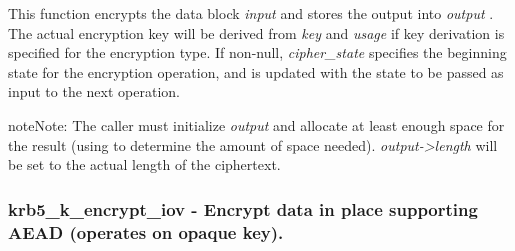 \documentclass[letterpaper,10pt,english]{sphinxmanual}
\begin{document}
This function encrypts the data block \emph{input} and stores the output into \emph{output} . The actual encryption key will be derived from \emph{key} and \emph{usage} if key derivation is specified for the encryption type. If non-null, \emph{cipher\_state} specifies the beginning state for the encryption operation, and is updated with the state to be passed as input to the next operation.

\begin{notice}{note}{Note:}
The caller must initialize \emph{output} and allocate at least enough space for the result (using {\hyperref[appdev/refs/api/krb5_c_encrypt_length:krb5_c_encrypt_length]{}} to determine the amount of space needed). \emph{output-\textgreater{}length} will be set to the actual length of the ciphertext.
\end{notice}


\subsubsection{krb5\_k\_encrypt\_iov -  Encrypt data in place supporting AEAD (operates on opaque key).}
\label{appdev/refs/api/krb5_k_encrypt_iov::doc}\label{appdev/refs/api/krb5_k_encrypt_iov:krb5-k-encrypt-iov-encrypt-data-in-place-supporting-aead-operates-on-opaque-key}

\begin{fulllineitems}
\label{appdev/refs/api/krb5_k_encrypt_iov:krb5_k_encrypt_iov}
\end{fulllineitems}
\end{document}
